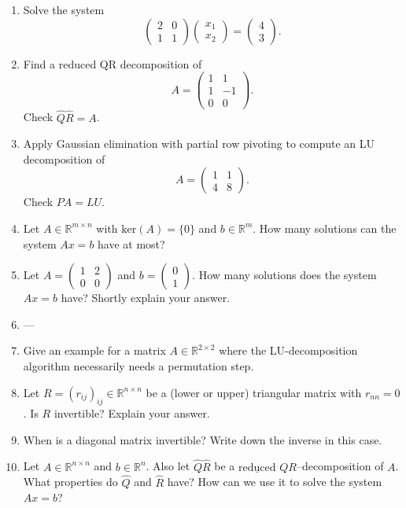 \begin{enumerate}
	
	\item Solve the system
	$$\begin{pmatrix}
	2 & 0\\
	1 & 1
	\end{pmatrix}\begin{pmatrix}
	x_1 \\ x_2
	\end{pmatrix} = \begin{pmatrix}
	4 \\ 3
	\end{pmatrix}.  $$
	\item Find a reduced QR decomposition of 
		$$A = \begin{pmatrix}
	1 & 1\\
	1 & -1 \\
	0 & 0
	\end{pmatrix} .$$
	Check $\widehat{Q}\widehat{R} = A$.
	\item Apply Gaussian elimination with partial row pivoting to compute an LU decomposition of 
	$$A = \begin{pmatrix}
	1 & 1\\
	4 & 8
	\end{pmatrix} .$$
	Check $PA=LU$.
	\item Let $A \in \mathbb{R}^{m \times n}$ with $\text{ker}(A)=\{0\}$ and $b \in \mathbb{R}^m$. How many solutions can the system $Ax=b$ have at most?
	\item Let $A = \begin{pmatrix}
	1 & 2\\
	0 & 0
	\end{pmatrix}$ and $b = \begin{pmatrix}
	0\\1
	\end{pmatrix}$. How many solutions does the system $Ax=b$ have? Shortly explain your answer.
	\item ---
	\item Give an example for a matrix $A \in \mathbb{R}^{2 \times 2}$ where the LU-decomposition algorithm
	necessarily needs a permutation step. 
\item Let $R=(r_{ij})_{ij} \in \mathbb{R}^{n \times n}$ be a (lower or upper) triangular matrix with $r_{nn} = 0$. Is $R$ invertible? Explain your answer.
\item When is a diagonal matrix invertible? Write down the inverse in this case.
\item Let $A\in\mathbb{R}^{n \times n}$ and $b \in \mathbb{R}^n$. Also let $\widehat{Q}\widehat{R}$ be a $\underline{\text{reduced}}$ $QR$--decomposition of $A$. What properties do $\widehat{Q}$ and $\widehat{R}$ have? How can we use it to solve the system $Ax = b$?

\end{enumerate}
